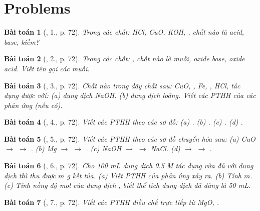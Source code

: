 \documentclass{article}
\newtheorem{baitoan}{Bài toán}
\begin{document}
\section{Problems}

\begin{baitoan}[\cite{SGK_KHTN_8_Canh_Dieu}, 1., p. 72]
	Trong các chất: \emph{HCl, CuO, KOH, }, chất nào là acid, base, kiềm?
\end{baitoan}

\begin{baitoan}[\cite{SGK_KHTN_8_Canh_Dieu}, 2., p. 72]
	Trong các chất: \emph{}, chất nào là muối, oxide base, oxide acid. Viết tên gọi các muối.
\end{baitoan}

\begin{baitoan}[\cite{SGK_KHTN_8_Canh_Dieu}, 3., p. 72]
	Chất nào trong dãy chất sau: \emph{CuO, , Fe, , HCl, } tác dụng được với: (a) dung dịch \emph{NaOH}. (b) dung dịch \emph{} loãng. Viết các PTHH của các phản ứng (nếu có).
\end{baitoan}

\begin{baitoan}[\cite{SGK_KHTN_8_Canh_Dieu}, 4., p. 72]
	Viết các PTHH theo các sơ đồ: (a) \emph{}. (b) \emph{}. (c) \emph{}. (d) \emph{}.
\end{baitoan}

\begin{baitoan}[\cite{SGK_KHTN_8_Canh_Dieu}, 5., p. 72]
	Viết các PTHH theo các sơ đồ chuyển hóa sau: (a) \emph{CuO $\to$  $\to$ }. (b) \emph{Mg $\to$  $\to$ }. (c) \emph{NaOH $\to$  $\to$ NaCl}. (d) \emph{ $\to$  $\to$ }.
\end{baitoan}

\begin{baitoan}[\cite{SGK_KHTN_8_Canh_Dieu}, 6., p. 72]
	Cho \emph{100 mL} dung dịch \emph{ 0.5 M} tác dụng vừa đủ với dung dịch \emph{} thì thu được $m$ \emph{g} kết tủa. (a) Viết PTHH của phản ứng xảy ra. (b) Tính $m$. (c) Tính nồng độ mol của dung dịch \emph{}, biết thể tích dung dịch \emph{} đã dùng là \emph{50 mL}.
\end{baitoan}

\begin{baitoan}[\cite{SGK_KHTN_8_Canh_Dieu}, 7., p. 72]
	Viết các PTHH điều chế \emph{} trực tiếp từ \emph{MgO, }.
\end{baitoan}
\end{document}
